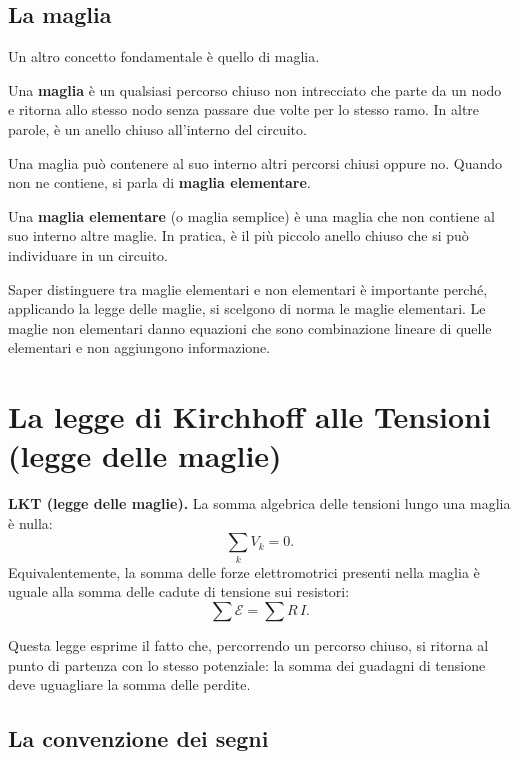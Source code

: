 \subsection{La maglia}

Un altro concetto fondamentale è quello di maglia.

\begin{concetto}
Una \textbf{maglia} è un qualsiasi percorso chiuso non intrecciato che parte da un nodo e ritorna allo stesso nodo senza passare due volte per lo stesso ramo. In altre parole, è un anello chiuso all'interno del circuito.
\end{concetto}

Una maglia può contenere al suo interno altri percorsi chiusi oppure no. Quando non ne contiene, si parla di \textbf{maglia elementare}.

\begin{concetto}
Una \textbf{maglia elementare} (o maglia semplice) è una maglia che non contiene al suo interno altre maglie. In pratica, è il più piccolo anello chiuso che si può individuare in un circuito.
\end{concetto}

\begin{attenzione}
Saper distinguere tra maglie elementari e non elementari è importante perché, applicando la legge delle maglie, si scelgono di norma le maglie elementari. Le maglie non elementari danno equazioni che sono combinazione lineare di quelle elementari e non aggiungono informazione.
\end{attenzione}


\section{La legge di Kirchhoff alle Tensioni (legge delle maglie)}

\begin{concetto}
\textbf{LKT (legge delle maglie).} La somma algebrica delle tensioni lungo una maglia è nulla:
\[
\sum_k V_k = 0.
\]
Equivalentemente, la somma delle forze elettromotrici presenti nella maglia è uguale alla somma delle cadute di tensione sui resistori:
\[
\sum \mathcal{E} = \sum R\,I.
\]
\end{concetto}

Questa legge esprime il fatto che, percorrendo un percorso chiuso, si ritorna al punto di partenza con lo stesso potenziale: la somma dei guadagni di tensione deve uguagliare la somma delle perdite.

\subsection{La convenzione dei segni}

